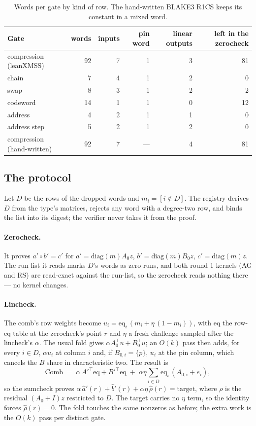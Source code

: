 \documentclass[11pt]{article}
\newcommand{\eq}{\mathrm{eq}}
\begin{document}
\begin{table}[h]
\centering
\small
\begin{tabular}{@{}lrrrrr@{}}
\toprule
Gate & words & inputs & pin word & linear outputs & left in the zerocheck\\
\midrule
compression (leanXMSS) & 92 & 7 & 1 & 3 & 81\\
chain & 7 & 4 & 1 & 2 & 0\\
swap & 8 & 3 & 1 & 2 & 2\\
codeword & 14 & 1 & 1 & 0 & 12\\
address & 4 & 2 & 1 & 1 & 0\\
address step & 5 & 2 & 1 & 2 & 0\\
compression (hand-written) & 92 & 7 & --- & 4 & 81\\
\bottomrule
\end{tabular}
\caption{Words per gate by kind of row. The hand-written BLAKE3 R1CS keeps
its constant in a mixed word.}\label{tab:census}
\end{table}

\subsection{The protocol}\label{sec:degreeone-protocol}

Let $D$ be the rows of the dropped words and $m_i = [i\notin D]$. The
registry derives $D$ from the type's matrices, rejects any word with a
degree-two row, and binds the list into its digest; the verifier never
takes it from the proof.

\paragraph{Zerocheck.} It proves $a'\circ b' = c'$ for
$a' = \mathrm{diag}(m)A_0 z$, $b' = \mathrm{diag}(m)B_0 z$,
$c' = \mathrm{diag}(m)z$. The run-list it reads marks $D$'s words as zero
runs, and both round-1 kernels (AG and RS) are read-exact against the
run-list, so the zerocheck reads nothing there --- no kernel changes.

\paragraph{Lincheck.} The comb's row weights become
$u_i = \eq_i\,(m_i + \eta\,(1 - m_i))$, with $\eq$ the row-eq table at the
zerocheck's point $r$ and $\eta$ a fresh challenge sampled after the
lincheck's $\alpha$. The usual fold gives $\alpha A_0^{\top}u + B_0^{\top}u$; an
$O(k)$ pass then adds, for every $i\in D$, $\alpha u_i$ at column $i$
and, if $B_{0,i} = \{p\}$, $u_i$ at the pin column, which cancels the
$B$ share in characteristic two. The result is
\[
\mathrm{Comb} \;=\; \alpha\,A'^{\top}\eq + B'^{\top}\eq
\;+\; \alpha\eta\sum_{i\in D}\eq_i\,(A_{0,i} + e_i),
\]
so the sumcheck proves
$\alpha\,\hat a'(r) + \hat b'(r) + \alpha\eta\,\hat\rho(r) = \mathrm{target}$,
where $\rho$ is the residual $(A_0 + I)z$ restricted to $D$. The target
carries no $\eta$ term, so the identity forces $\hat\rho(r) = 0$. The fold
touches the same nonzeros as before; the extra work is the $O(k)$ pass per
distinct gate.
\end{document}
